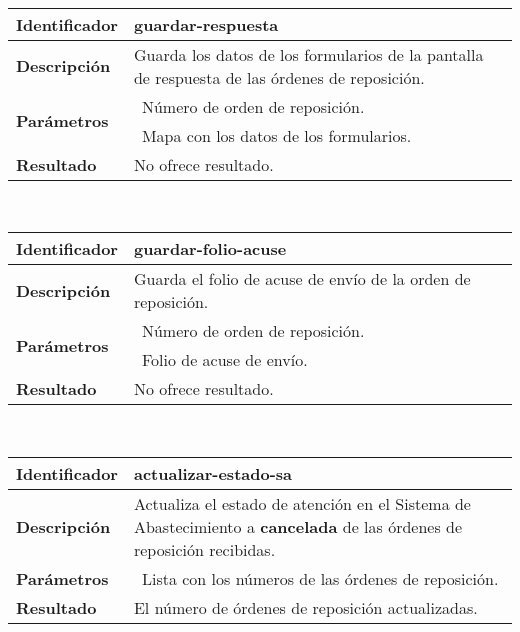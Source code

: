 	\vspace{5mm}\\
	\begin{tabular}{|p{}|p{}|}
		\hline
		\textbf{Identificador}	& \textbf{guardar-respuesta}\\
		\hline
		\hline
		\textbf{Descripción}	& Guarda los datos de los formularios de la pantalla de respuesta de las órdenes de reposición.\\
		\hline
		\multirow{2}{*}{\textbf{Parámetros}}	& \textbullet\, Número de orden de reposición.\\
												& \textbullet\, Mapa con los datos de los formularios.\\
		\hline
		\textbf{Resultado}		& No ofrece resultado.\\
		\hline
	\end{tabular}
	\vspace{5mm}\\
	\begin{tabular}{|p{}|p{}|}
		\hline
		\textbf{Identificador}	& \textbf{guardar-folio-acuse}\\
		\hline
		\hline
		\textbf{Descripción}	& Guarda el folio de acuse de envío de la orden de reposición.\\
		\hline
		\multirow{2}{*}{\textbf{Parámetros}} 	& \textbullet\, Número de orden de reposición.\\
												& \textbullet\, Folio de acuse de envío.\\
		\hline
		\textbf{Resultado}		& No ofrece resultado.\\
		\hline
	\end{tabular}
	\vspace{5mm}\\
	\begin{tabular}{|p{}|p{}|}
		\hline
		\textbf{Identificador}	& \textbf{actualizar-estado-sa}\\
		\hline
		\hline
		\textbf{Descripción}	& Actualiza el estado de atención en el Sistema de Abastecimiento a \textbf{cancelada} de las órdenes de reposición recibidas.\\
		\hline
		\textbf{Parámetros} 	& \textbullet\, Lista con los números de las órdenes de reposición.\\
		\hline
		\textbf{Resultado}		& El número de órdenes de reposición actualizadas.\\
		\hline
	\end{tabular}
